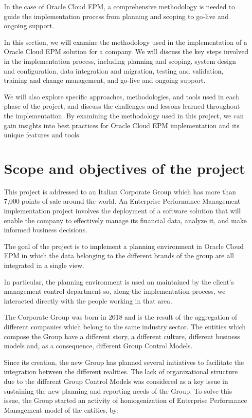 \documentclass[12pt,a4paper,openright,twoside]{book}
\begin{document}
In the case of Oracle Cloud EPM, a comprehensive methodology is needed to guide the implementation process from planning and scoping to go-live and ongoing support.

In this section, we will examine the methodology used in the implementation of a Oracle Cloud EPM solution for a company.
%
We will discuss the key steps involved in the implementation process, including planning and scoping, system design and configuration, data integration and migration, testing and validation, training and change management, and go-live and ongoing support. 

We will also explore specific approaches, methodologies, and tools used in each phase of the project, and discuss the challenges and lessons learned throughout the implementation. 
%
By examining the methodology used in this project, we can gain insights into best practices for Oracle Cloud EPM implementation and its unique features and tools.

\section{Scope and objectives of the project}

This project is addressed to an Italian Corporate Group which has more than 7,000 points of sale around the world. 
%
An Enterprise Performance Management implementation project involves the deployment of a software solution that will enable the company to effectively manage its financial data, analyze it, and make informed business decisions.

The goal of the project is to implement a planning environment in Oracle Cloud EPM in which the data belonging to the different brands of the group are all integrated in a single view.

In particular, the planning environment is used an maintained by the client's management control department so, along the implementation process, we interacted directly with the people working in that area.

The Corporate Group was born in 2018 and is the result of the aggregation of different companies which belong to the same industry sector.
%
The entities which compose the Group have a different story, a different culture, different business models and, as a consequence, different Group Control Models.

Since its creation, the new Group has planned several initiatives to facilitate the integration between the different realities.
%
The lack of organizational structure due to the different Group Control Models was considered as a key issue in sustaining the new planning and reporting needs of the Group.
%
To solve this issue, the Group started an activity of  homogenization of Enterprise Performance Management model of the entities, by:
\end{document}

